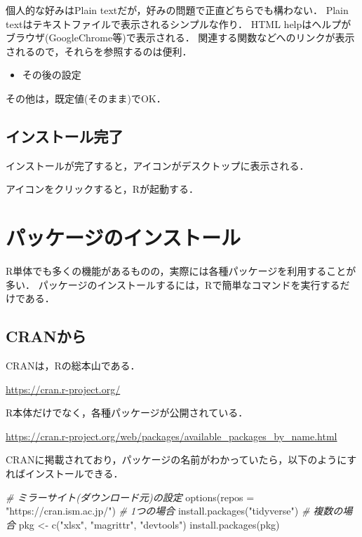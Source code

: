 \documentclass[
]{article}
\newenvironment{Shaded}{\begin{snugshade}}{\end{snugshade}}
\newcommand{\AttributeTok}[1]{\textcolor[rgb]{0.77,0.63,0.00}{#1}}
\newcommand{\CommentTok}[1]{\textcolor[rgb]{0.56,0.35,0.01}{\textit{#1}}}
\newcommand{\FunctionTok}[1]{\textcolor[rgb]{0.00,0.00,0.00}{#1}}
\newcommand{\NormalTok}[1]{#1}
\newcommand{\OtherTok}[1]{\textcolor[rgb]{0.56,0.35,0.01}{#1}}
\newcommand{\StringTok}[1]{\textcolor[rgb]{0.31,0.60,0.02}{#1}}
\providecommand{\tightlist}{%
  \setlength{\itemsep}{0pt}\setlength{\parskip}{0pt}}
\begin{document}
個人的な好みはPlain textだが，好みの問題で正直どちらでも構わない．
Plain textはテキストファイルで表示されるシンプルな作り．
HTML helpはヘルプがブラウザ(GoogleChrome等)で表示される．
関連する関数などへのリンクが表示されるので，それらを参照するのは便利．

\begin{itemize}
\tightlist
\item
  その後の設定
\end{itemize}

その他は，既定値(そのまま)でOK．

\hypertarget{ux30a4ux30f3ux30b9ux30c8ux30fcux30ebux5b8cux4e86}{%
\subsection{インストール完了}\label{ux30a4ux30f3ux30b9ux30c8ux30fcux30ebux5b8cux4e86}}

インストールが完了すると，アイコンがデスクトップに表示される．

アイコンをクリックすると，Rが起動する．

\hypertarget{package}{%
\section{パッケージのインストール}\label{package}}

R単体でも多くの機能があるものの，実際には各種パッケージを利用することが多い．
パッケージのインストールするには，Rで簡単なコマンドを実行するだけである．

\hypertarget{cran}{%
\subsection{CRANから}\label{cran}}

CRANは，Rの総本山である．

\url{https://cran.r-project.org/}

R本体だけでなく，各種パッケージが公開されている．

\url{https://cran.r-project.org/web/packages/available_packages_by_name.html}

CRANに掲載されており，パッケージの名前がわかっていたら，以下のようにすればインストールできる．

\begin{Shaded}
\begin{Highlighting}[]
  \CommentTok{\# ミラーサイト(ダウンロード元)の設定}
\FunctionTok{options}\NormalTok{(}\AttributeTok{repos =} \StringTok{"https://cran.ism.ac.jp/"}\NormalTok{)}
  \CommentTok{\# 1つの場合}
\FunctionTok{install.packages}\NormalTok{(}\StringTok{"tidyverse"}\NormalTok{)}
  \CommentTok{\# 複数の場合}
\NormalTok{pkg }\OtherTok{\textless{}{-}} \FunctionTok{c}\NormalTok{(}\StringTok{"xlsx"}\NormalTok{, }\StringTok{"magrittr"}\NormalTok{, }\StringTok{"devtools"}\NormalTok{)}
\FunctionTok{install.packages}\NormalTok{(pkg)}
\end{Highlighting}
\end{Shaded}
\end{document}
